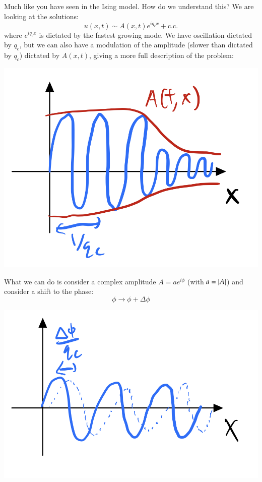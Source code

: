 Much like you have seen in the Ising model. How do we understand this? We are looking at the solutions:
\begin{equation}
    u(x, t) \sim A(x, t)e^{iq_c x} + \text{c.c.}
\end{equation}
where $e^{iq_c x}$ is dictated by the fastest growing mode. We have oscillation dictated by $q_c$, but we can also have a modulation of the amplitude (slower than dictated by $q_c$) dictated by $A(x, t)$, giving a more full description of the problem:

\begin{center}
    \includegraphics[scale=0.35]{Lectures/Images/lec18-Amodulation.png}
\end{center}

What we can do is consider a complex amplitude $A = ae^{i\phi}$ (with $a = \lvert A \rvert$) and consider a shift to the phase:
\begin{equation}
    \phi \to \phi + \Delta \phi
\end{equation}

\begin{center}
    \includegraphics[scale=0.35]{Lectures/Images/lec18-phasediff.png}
\end{center}

